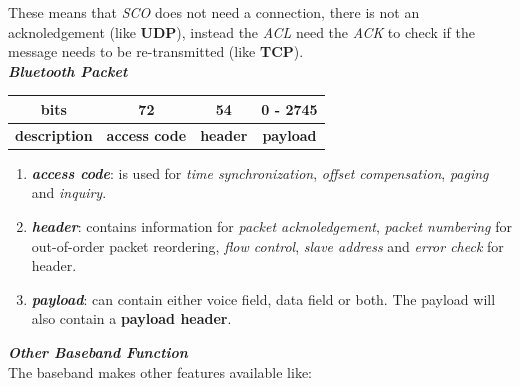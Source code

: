 These means that \textit{SCO} does not need a connection, there is not an acknoledgement (like \textbf{UDP}), instead the \textit{ACL} need the \textit{ACK} to check if the message needs to be re-transmitted (like \textbf{TCP}). \\
\textbf{\textit{Bluetooth Packet}}
\begin{center}
    \begin{tabular}{ | c | c | c | c | } \hline
        \textbf{bits} & 72 & 54 & 0 - 2745 \\ \hline
        \textbf{description} & \textbf{access code} & \textbf{header} & \textbf{payload} \\ \hline
    \end{tabular}
\end{center}
\begin{enumerate}[nosep]
    \item \textbf{\textit{access code}}: is used for \textit{time synchronization}, \textit{offset compensation}, \textit{paging} and \textit{inquiry}.
    \item \textbf{\textit{header}}: contains information for \textit{packet acknoledgement}, \textit{packet numbering} for out-of-order packet reordering, \textit{flow control}, \textit{slave address} and \textit{error check} for header.
    \item \textbf{\textit{payload}}: can contain either voice field, data field or both. The payload will also contain a \textbf{payload header}.
\end{enumerate}
\textbf{\textit{Other Baseband Function}} \\
The baseband makes other features available like:
